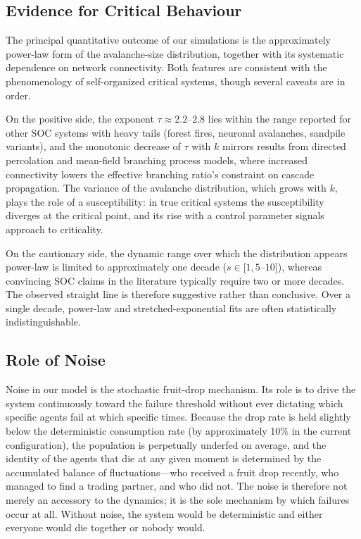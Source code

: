 \documentclass[11pt,a4paper]{article}
\begin{document}
\subsection{Evidence for Critical Behaviour}

The principal quantitative outcome of our simulations is the
approximately power-law form of the avalanche-size distribution, together
with its systematic dependence on network connectivity. Both features are
consistent with the phenomenology of self-organized critical systems,
though several caveats are in order.

On the positive side, the exponent $\tau \approx 2.2$--$2.8$ lies within
the range reported for other SOC systems with heavy tails (forest fires,
neuronal avalanches, sandpile variants), and the monotonic decrease of
$\tau$ with $k$ mirrors results from directed percolation and mean-field
branching process models, where increased connectivity lowers the
effective branching ratio's constraint on cascade propagation. The
variance of the avalanche distribution, which grows with $k$, plays the
role of a susceptibility: in true critical systems the susceptibility
diverges at the critical point, and its rise with a control parameter
signals approach to criticality.

On the cautionary side, the dynamic range over which the distribution
appears power-law is limited to approximately one decade ($s \in [1,
5$--$10]$), whereas convincing SOC claims in the literature typically
require two or more decades. The observed straight line is therefore
suggestive rather than conclusive. Over a single decade, power-law and
stretched-exponential fits are often statistically indistinguishable.

\subsection{Role of Noise}

Noise in our model is the stochastic fruit-drop mechanism. Its role is to
drive the system continuously toward the failure threshold without ever
dictating which specific agents fail at which specific times. Because the
drop rate is held slightly below the deterministic consumption rate (by
approximately 10\% in the current configuration), the population is
perpetually underfed on average, and the identity of the agents that die
at any given moment is determined by the accumulated balance of
fluctuations---who received a fruit drop recently, who managed to find a
trading partner, and who did not. The noise is therefore not merely an
accessory to the dynamics; it is the sole mechanism by which failures
occur at all. Without noise, the system would be deterministic and either
everyone would die together or nobody would.
\end{document}
